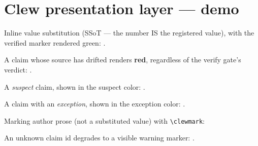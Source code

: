 \documentclass[11pt]{article}
\begin{document}
\section*{Clew presentation layer — demo}

\clewExplainer

\noindent
Inline value substitution (SSoT — the number IS the registered value), with
the verified marker rendered green:
.

\medskip\noindent
A claim whose source has drifted renders \textbf{red}, regardless of the
verify gate's verdict:
.

\medskip\noindent
A \emph{suspect} claim, shown in the suspect color:
.

\medskip\noindent
A claim with an \emph{exception}, shown in the exception color:
.

\medskip\noindent
Marking author prose (not a substituted value) with \verb|\clewmark|:

\medskip\noindent
An unknown claim id degrades to a visible warning marker:
.
\end{document}
